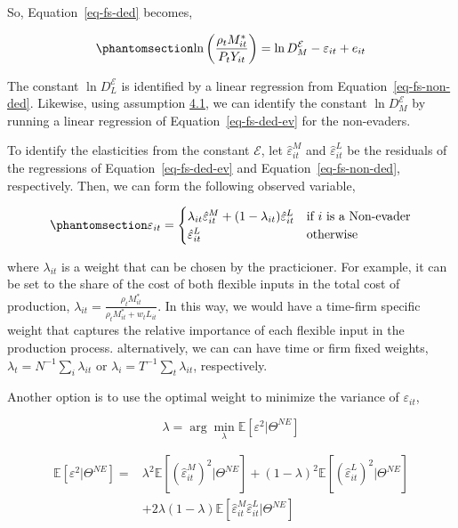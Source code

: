 \documentclass[
  12pt]{article}
\theoremstyle{definition}
\theoremstyle{remark}
\begin{document}
So, Equation~\ref{eq-fs-ded} becomes,

\begin{equation}\phantomsection\label{eq-fs-ded-ev}{
 \ln\left(\frac{\rho_t M^*_{it}}{P_t Y_{it}}\right)=\ln D^{\mathcal{E}}_M -\varepsilon_{it}+e_{it}
}\end{equation}

The constant \(\ln D^{\mathcal{E}}_L\) is identified by a linear
regression from Equation~\ref{eq-fs-non-ded}. Likewise, using assumption
\hyperref[ass-non-ev]{4.1}, we can identify the constant
\(\ln D^{\mathcal{E}}_M\) by running a linear regression of
Equation~\ref{eq-fs-ded-ev} for the non-evaders.

To identify the elasticities from the constant \(\mathcal{E}\), let
\(\hat\varepsilon^M_{it}\) and \(\hat\varepsilon^L_{it}\) be the
residuals of the regressions of Equation~\ref{eq-fs-ded-ev} and
Equation~\ref{eq-fs-non-ded}, respectively. Then, we can form the
following observed variable,

\begin{equation}\phantomsection\label{eq-wgt-eps}{
\varepsilon_{it}= \begin{cases}
\lambda_{it} \hat \varepsilon^M_{it} + (1-\lambda_{it}) \hat \varepsilon^L_{it} & \text{if $i$ is a Non-evader}\\
\hat \varepsilon^L_{it} & \text{otherwise}
\end{cases}
}\end{equation}

where \(\lambda_{it}\) is a weight that can be chosen by the
practicioner. For example, it can be set to the share of the cost of
both flexible inputs in the total cost of production,
\(\lambda_{it}=\frac{\rho_t M^*_{it}}{\rho_t M^*_{it}+w_t L_{it}}\). In
this way, we would have a time-firm specific weight that captures the
relative importance of each flexible input in the production process.
alternatively, we can can have time or firm fixed weights,
\(\lambda_t=N^{-1}\sum_i\lambda_{it}\) or
\(\lambda_i=T^{-1}\sum_t\lambda_{it}\), respectively.

Another option is to use the optimal weight to minimize the variance of
\(\varepsilon_{it}\),

\[
\lambda = \arg\min_{\lambda} \mathbb{E}\left[\varepsilon^2|\Theta^{NE}\right]
\]

\[
\begin{aligned}
\mathbb{E}\left[\varepsilon^2|\Theta^{NE}\right] =&\lambda^2 \mathbb{E}\left[\left(\hat \varepsilon^M_{it}\right)^2|\Theta^{NE}\right] + (1-\lambda)^2 \mathbb{E}\left[\left(\hat \varepsilon^L_{it}\right)^2|\Theta^{NE}\right]\\
&+ 2\lambda(1-\lambda)\mathbb{E}\left[\hat \varepsilon^M_{it}\hat \varepsilon^L_{it}|\Theta^{NE}\right]
\end{aligned}
\]
\end{document}
